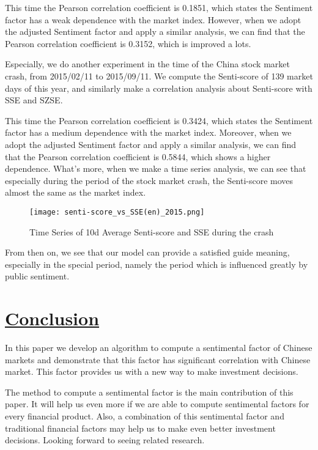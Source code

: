 \documentclass[10pt, conference, compsocconf]{IEEEtran}
\begin{document}
This time the Pearson correlation coefficient is 0.1851, which states the Sentiment factor has a weak dependence with the market index. However, when we adopt the adjusted Sentiment factor and apply a similar analysis, we can find that the Pearson correlation coefficient is 0.3152, which is improved a lots.

Especially, we do another experiment in the time of the China stock market crash, from 2015/02/11 to 2015/09/11. We compute the Senti-score of 139 market days of this year, and similarly make a correlation analysis about Senti-score with SSE and SZSE.

This time the Pearson correlation coefficient is 0.3424, which states the Sentiment factor has a medium dependence with the market index. Moreover, when we adopt the adjusted Sentiment factor and apply a similar analysis, we can find that the Pearson correlation coefficient is 0.5844, which shows a higher dependence. What's more, when we make a time series analysis, we can see that especially during the period of the stock market crash, the Senti-score moves almost the same as the market index.

\begin{figure}[ht]
\centering
\texttt{[image: senti-score\_vs\_SSE(en)\_2015.png]}
\caption{Time Series of 10d Average Senti-score and SSE during the crash}
\end{figure}

From then on, we see that our model can provide a satisfied guide meaning, especially in the special period, namely the period which is influenced greatly by public sentiment.

\section{\underline{Conclusion}}

In this paper we develop an algorithm to compute a sentimental factor of Chinese markets and demonstrate that this factor has significant correlation with Chinese market. This factor provides us with a new way to make investment decisions.

The method to compute a sentimental factor is the main contribution of this paper. It will help us even more if we are able to compute sentimental factors for every financial product. Also, a combination of this sentimental factor and traditional financial factors may help us to make even better investment decisions. Looking forward to seeing related research.
\end{document}
